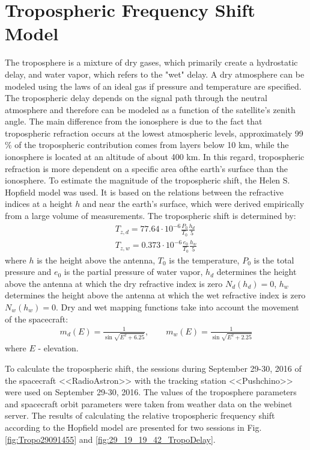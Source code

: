 \documentclass[a4paper,english,bopenany]{article}
\begin{document}
\section{ Tropospheric Frequency Shift Model}

The troposphere is a mixture of dry gases, which primarily create a hydrostatic delay, and water vapor, which refers to the "wet" delay. A dry atmosphere can be modeled using the laws of an ideal gas if pressure and temperature are specified. The tropospheric delay depends on the signal path through the neutral atmosphere and therefore can be modeled as a function of the satellite’s zenith angle. The main difference from the ionosphere is due to the fact that tropospheric refraction occurs at the lowest atmospheric levels, approximately 99 $\%$ of the tropospheric contribution comes from layers below 10 km, while the ionosphere is located at an altitude of about 400 km. In this regard, tropospheric refraction is more dependent on a specific area of ​​the earth's surface than the ionosphere. To estimate the magnitude of the tropospheric shift, the Helen S. Hopfield \cite{Hopfield} model was used. It is based on the relations between the refractive indices at a height $h$ and near the earth's surface, which were derived empirically from a large volume of measurements. 
The tropospheric shift is determined by:
 \begin{eqnarray} 
 T_{z,d} = 77.64\cdot10^{-6}\frac{P_0}{T_0}\frac{h_d}{5} \\
 T_{z,w} = 0.373\cdot10^{-6}\frac{e_0}{T_0}\frac{h_w}{5}
 \end{eqnarray} 
{ where $ h $ is the height above the antenna, $ T_0 $ is the temperature, $ P_0 $ is the total pressure and $ e_0 $ is the partial pressure of water vapor, $ h_d $ determines the height above the antenna at which the dry refractive index is zero $ N_d (h_d) = 0 $, $ h_w $ determines the height above the antenna at which the wet refractive index is zero $ N_w (h_w) = 0 $. }
Dry and wet mapping functions take into account the movement of the spacecraft:
 \begin{eqnarray} 
 m_d(E) = \frac{1}{\sin\sqrt{E^2+6.25}}, \qquad m_w(E) = \frac{1}{\sin\sqrt{E^2 + 2.25}}
 \end{eqnarray}
   where $E$ - elevation.
       
       
To calculate the tropospheric shift, the sessions during September 29-30, 2016 of the spacecraft <<RadioAstron>> with the tracking station <<Pushchino>> were used on September 29-30, 2016. The values of the troposphere parameters and spacecraft orbit parameters were taken from weather data on the webinet server. The results of calculating the relative tropospheric frequency shift according to the Hopfield model are presented for two sessions in Fig. 	\ref{fig:Tropo29091455} and 	\ref{fig:29_19_19_42_TropoDelay}.
\end{document}
